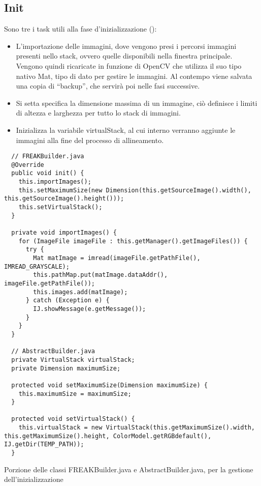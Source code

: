 \subsection{Init}
\noindent Sono tre i task utili alla fase d'inizializzazione ():
\begin{itemize}
    \item L'importazione delle immagini, dove vengono presi i percorsi immagini presenti nello stack, ovvero quelle disponibili nella finestra principale. Vengono quindi ricaricate in funzione di OpenCV che utilizza il suo tipo nativo Mat, tipo di dato per gestire le immagini. Al contempo viene salvata una copia di ``backup'', che servirà poi nelle fasi successive.
    \item Si setta specifica la dimensione massima di un immagine, ciò definisce i limiti di altezza e larghezza per tutto lo stack di immagini.
    \item Inizializza la variabile virtualStack, al cui interno verranno aggiunte le immagini alla fine del processo di allineamento.
\end{itemize}

\begin{listing}[H]
\begin{verbatim}
  // FREAKBuilder.java
  @Override
  public void init() {
    this.importImages();
    this.setMaximumSize(new Dimension(this.getSourceImage().width(), this.getSourceImage().height()));
    this.setVirtualStack();
  }

  private void importImages() {
    for (ImageFile imageFile : this.getManager().getImageFiles()) {
      try {
        Mat matImage = imread(imageFile.getPathFile(), IMREAD_GRAYSCALE);
        this.pathMap.put(matImage.dataAddr(), imageFile.getPathFile());
        this.images.add(matImage);
      } catch (Exception e) {
        IJ.showMessage(e.getMessage());
      }
    }
  }

  // AbstractBuilder.java 
  private VirtualStack virtualStack;
  private Dimension maximumSize;

  protected void setMaximumSize(Dimension maximumSize) {
    this.maximumSize = maximumSize;
  }

  protected void setVirtualStack() {
    this.virtualStack = new VirtualStack(this.getMaximumSize().width, this.getMaximumSize().height, ColorModel.getRGBdefault(), IJ.getDir(TEMP_PATH));
  }
\end{verbatim}
\caption{Porzione delle classi FREAKBuilder.java e AbstractBuilder.java, per la gestione dell'inizializzazione}\label{lst:init}
\end{listing}

